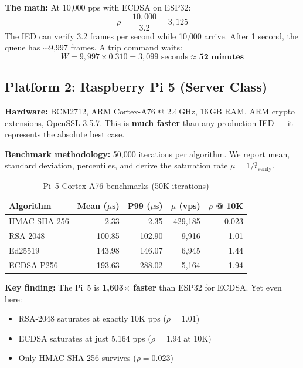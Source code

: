 \documentclass[11pt,a4paper,twocolumn]{article}
\begin{document}
\textbf{The math:} At 10{,}000 pps with ECDSA on ESP32:
\begin{equation}
\rho = \frac{10{,}000}{3.2} = 3{,}125
\end{equation}
The IED can verify 3.2 frames per second while 10{,}000 arrive. After 1 second, the queue has $\sim$9{,}997 frames. A trip command waits:
\begin{equation}
W = 9{,}997 \times 0.310 = 3{,}099 \text{ seconds} \approx \textbf{52 minutes}
\end{equation}

\subsection{Platform 2: Raspberry Pi 5 (Server Class)}

\textbf{Hardware:} BCM2712, ARM Cortex-A76 @ 2.4\,GHz, 16\,GB RAM, ARM crypto extensions, OpenSSL 3.5.7. This is \textbf{much faster} than any production IED --- it represents the absolute best case.

\textbf{Benchmark methodology:} 50{,}000 iterations per algorithm. We report mean, standard deviation, percentiles, and derive the saturation rate $\mu = 1/\bar{t}_{\text{verify}}$.

\begin{table}[H]
\centering
\caption{Pi~5 Cortex-A76 benchmarks (50K iterations)}
\label{tab:pi5}
\scriptsize
\begin{tabular}{@{}lrrrr@{}}
\toprule
\textbf{Algorithm} & \textbf{Mean ($\mu$s)} & \textbf{P99 ($\mu$s)} & \textbf{$\mu$ (vps)} & \textbf{$\rho$ @ 10K} \\
\midrule
HMAC-SHA-256 & 2.33 & 2.35 & 429{,}185 & 0.023 \\
RSA-2048 & 100.85 & 102.90 & 9{,}916 & 1.01 \\
Ed25519 & 143.98 & 146.07 & 6{,}945 & 1.44 \\
ECDSA-P256 & 193.63 & 288.02 & 5{,}164 & 1.94 \\
\bottomrule
\end{tabular}
\end{table}

\textbf{Key finding:} The Pi~5 is \textbf{1{,}603$\times$ faster} than ESP32 for ECDSA. Yet even here:
\begin{itemize}[leftmargin=1.5em,itemsep=1pt]
\item RSA-2048 saturates at exactly 10K pps ($\rho = 1.01$)
\item ECDSA saturates at just 5{,}164 pps ($\rho = 1.94$ at 10K)
\item Only HMAC-SHA-256 survives ($\rho = 0.023$)
\end{itemize}
\end{document}
